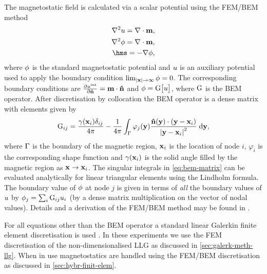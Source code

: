 \documentclass[10pt, final, conference, transmag]{IEEEtran}
\begin{document}
The magnetostatic field is calculated via a scalar potential
using the FEM/BEM method \cite{Fredkin1990}\cite{Knittel2011}
\begin{equation}
  \begin{aligned}
    \label{eq:fem-bem}
    \lap \phione = \nabla \cdot \mv, \\
    \lap \phim = \nabla \cdot \mv, \\
    \hms = -\grad \phim,
  \end{aligned}
\end{equation}
where $\phi$ is the standard magnetostatic potential and $u$ is an auxiliary potential used to apply the boundary condition $\lim_{|\mathbf{x}| \rightarrow \infty} \phi = 0$.
The corresponding boundary conditions are $\frac{\partial u^{\text{int}}}{\partial \mathbf{\hat{n}}} = \mathbf{m} \cdot \mathbf{\hat{n}}$ and $\phi = {\mathbf{\mathrm{G}}} \big[ u \big]$, where ${\mathbf{\mathrm{G}}}$ is the BEM operator. After discretisation by collocation the BEM operator is a dense matrix with elements given by
\begin{equation}
  \begin{aligned}
    {\mathbf{\mathrm{G}}}_{ij} = \frac{\gamma(\mathbf{x}_i)\delta_{ij}}{4\pi} 
- \frac{1}{4 \pi} \int_{\Gamma} \varphi_{j}(\mathbf{y}) \frac{\mathbf{\hat{n}}(\mathbf{y}) \cdot (\mathbf{y} - \mathbf{x}_{i} )}{\left|{\mathbf{y} - \mathbf{x}_i} \right| ^2} {\; \text{d}} \mathbf{y},
    \label{eq:bem-matrix}
  \end{aligned}
\end{equation}
where ${\Gamma}$ is the boundary of the magnetic region, $\mathbf{x}_i$ is the location of node $i$, $\varphi_{i}$ is the corresponding shape function and $\gamma(\mathbf{x}_i)$ is the solid angle filled by the magnetic region as $ \mathbf{x} \rightarrow \mathbf{x}_i$.
The singular integrals in \eqref{eq:bem-matrix} can be evaluated analytically for linear triangular elements using the Lindholm formula\cite{Lindholm1984}.
The boundary value of $\phi$ at node $j$ is given in terms of \emph{all} the boundary values of $u$ by $\phi_j = \sum_i {\mathbf{\mathrm{G}}}_{ij} u_i$ (\ie by a dense matrix multiplication on the vector of nodal values).
Details and a derivation of the FEM/BEM method may be found in \cite[Sec 2.2]{Knittel2011}.


For all equations other than the BEM operator a standard linear Galerkin finite
element discretisation is used \cite[25]{HowardElmanDavidSilvester2006}.
\else
In these experiments we use the FEM discretisation of the non-dimensionalised LLG as discussed in \autoref{sec:galerk-meth-llg}.
When in use magnetostatics are handled using the FEM/BEM discretisation as discussed in \autoref{sec:hybr-finit-elem}.
\fi
\end{document}
